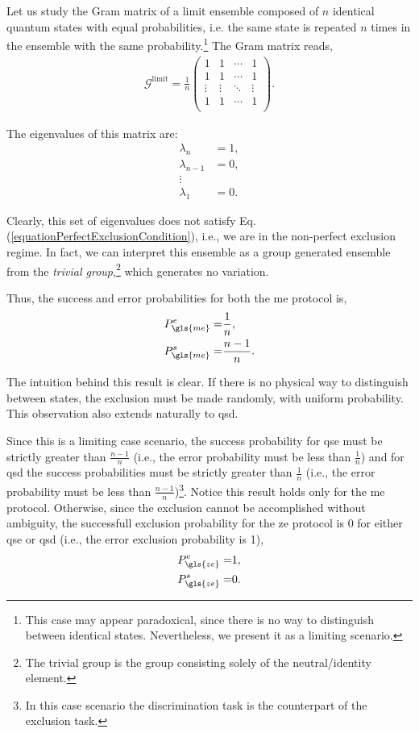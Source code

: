 \documentclass[12pt,letterpaper]{article}
\begin{document}
\hspace{20pt}Let us study the Gram matrix of a limit ensemble composed of $n$ identical quantum states with equal probabilities, i.e. the same state is repeated $n$ times in the ensemble with the same probability.\footnote{This case may appear paradoxical, since there is no way to distinguish between identical states. Nevertheless, we present it as a limiting scenario.} The Gram matrix reads,
\begin{align*}
	\mathcal{G}^{\text{limit}} = \frac{1}{n}\begin{pmatrix}
 1 & 1 & \cdots & 1 \\
 1 & 1 & \cdots & 1 \\
 \vdots & \vdots & \ddots & \vdots \\
 1 & 1 & \cdots & 1 \\
\end{pmatrix}.
\end{align*}

The eigenvalues of this matrix are:
\begin{align*}
	\lambda_n &= 1, \\
	\lambda_{n-1} &= 0, \\
	\vdots \\
	\lambda_1 &= 0.
\end{align*}

Clearly, this set of eigenvalues does not satisfy Eq. (\ref{equationPerfectExclusionCondition}), i.e., we are in the non-perfect exclusion regime. In fact, we can interpret this ensemble as a group generated ensemble from the \emph{trivial group},\footnote{The trivial group is the group consisting solely of the neutral/identity element.} which generates no variation.

Thus, the success and error probabilities for both the \gls{me} protocol is,
\begin{align*}
	P_{\gls{me}}^e =& \frac{1}{n},\\
	P_{\gls{me}}^s =& \frac{n-1}{n}.
\end{align*}

The intuition behind this result is clear. If there is no physical way to distinguish between states, the exclusion must be made randomly, with uniform probability. This observation also extends naturally to \gls{qsd}.

Since this is a limiting case scenario, the success probability for \gls{qse} must be strictly greater than $\frac{n-1}{n}$ (i.e., the error probability must be less than $\frac{1}{n}$) and for \gls{qsd} the success probabilities must be strictly greater than $\frac{1}{n}$ (i.e., the error probability must be less than $\frac{n-1}{n}$)\footnote{In this case scenario the discrimination task is the counterpart of the exclusion task.}. Notice this result holds only for the \gls{me} protocol. Otherwise, since the exclusion cannot be accomplished without ambiguity, the successfull exclusion probability for the \gls{ze} protocol is 0 for either \gls{qse} or \gls{qsd} (i.e., the error exclusion probability is 1), 
\begin{align*}
	P_{\gls{ze}}^e =& 1,\\
	P_{\gls{ze}}^s =& 0.
\end{align*}
\end{document}
